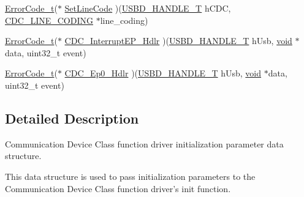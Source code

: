 \begin{DoxyCompactItemize}
\item 
\hyperlink{error_8h_a905255056c349318139d94aa4523d516}{Error\-Code\-\_\-t}($\ast$ \hyperlink{structUSBD__CDC__INIT__PARAM_a2748910b8e9d956af0c1e91d98283c67}{Set\-Line\-Code} )(\hyperlink{group__USBD__Core_gafdbb2204d929cb9d75736bd2b42342ac}{U\-S\-B\-D\-\_\-\-H\-A\-N\-D\-L\-E\-\_\-\-T} h\-C\-D\-C, \hyperlink{usbd__cdc_8h_a1d66ffafad206be2563c72cb972fbf52}{C\-D\-C\-\_\-\-L\-I\-N\-E\-\_\-\-C\-O\-D\-I\-N\-G} $\ast$line\-\_\-coding)
\item 
\hyperlink{error_8h_a905255056c349318139d94aa4523d516}{Error\-Code\-\_\-t}($\ast$ \hyperlink{structUSBD__CDC__INIT__PARAM_a4e41f01ff5f1be7cd6c286f1c2e41440}{C\-D\-C\-\_\-\-Interrupt\-E\-P\-\_\-\-Hdlr} )(\hyperlink{group__USBD__Core_gafdbb2204d929cb9d75736bd2b42342ac}{U\-S\-B\-D\-\_\-\-H\-A\-N\-D\-L\-E\-\_\-\-T} h\-Usb, \hyperlink{Paradigm_2Tern__EE_2small_2portmacro_8h_a14d32f8130d3c0b212cfc751730b5b49}{void} $\ast$data, uint32\-\_\-t event)
\item 
\hyperlink{error_8h_a905255056c349318139d94aa4523d516}{Error\-Code\-\_\-t}($\ast$ \hyperlink{structUSBD__CDC__INIT__PARAM_a3c253a8bc65105c6d5590375bd296b0b}{C\-D\-C\-\_\-\-Ep0\-\_\-\-Hdlr} )(\hyperlink{group__USBD__Core_gafdbb2204d929cb9d75736bd2b42342ac}{U\-S\-B\-D\-\_\-\-H\-A\-N\-D\-L\-E\-\_\-\-T} h\-Usb, \hyperlink{Paradigm_2Tern__EE_2small_2portmacro_8h_a14d32f8130d3c0b212cfc751730b5b49}{void} $\ast$data, uint32\-\_\-t event)
\end{DoxyCompactItemize}


\subsection{Detailed Description}
Communication Device Class function driver initialization parameter data structure. 

This data structure is used to pass initialization parameters to the Communication Device Class function driver's init function. 

